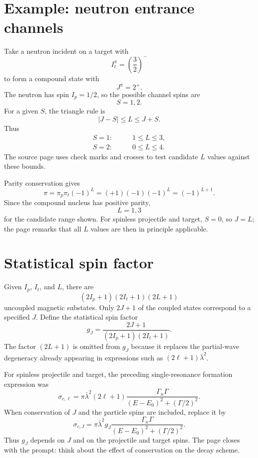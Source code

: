 \section{Example: neutron entrance channels}
Take a neutron incident on a target with
\[
  I_t^\pi=\left(\frac32\right)^-
\]
to form a compound state with
\[
  J^\pi=2^+.
\]
The neutron has spin $I_p=1/2$, so the possible channel spins are
\[
  S=1,2.
\]
For a given $S$, the triangle rule is
\begin{equation}
  |J-S|\le L\le J+S.
  \label{eq:res-L-triangle}
\end{equation}
Thus
\begin{align*}
  S=1:&\qquad 1\le L\le3,\\
  S=2:&\qquad 0\le L\le4.
\end{align*}
The source page uses check marks and crosses to test candidate $L$ values against these bounds.

Parity conservation gives
\[
  \pi=\pi_p\pi_t(-1)^L
  =(+1)(-1)(-1)^L
  =(-1)^{L+1}.
\]
Since the compound nucleus has positive parity,
\begin{equation}
  L=1,3
  \label{eq:res-example-odd-L}
\end{equation}
for the candidate range shown.  For spinless projectile and target, $S=0$, so $J=L$; the page remarks that all $L$ values are then in principle applicable.


\section{Statistical spin factor}
Given $I_p$, $I_t$, and $L$, there are
\[
  (2I_p+1)(2I_t+1)(2L+1)
\]
uncoupled magnetic substates.  Only $2J+1$ of the coupled states correspond to a specified $J$.  Define the statistical spin factor
\begin{equation}
  \boxed{
  g_J=\frac{2J+1}{(2I_p+1)(2I_t+1)}.}
  \label{eq:res-statistical-spin-factor}
\end{equation}
The factor $(2L+1)$ is omitted from $g_J$ because it replaces the partial-wave degeneracy already appearing in expressions such as $(2\ell+1)\bar\lambda^2$.

For spinless projectile and target, the preceding single-resonance formation expression was
\[
  \sigma_{c,\ell}
  =\pi\bar\lambda^2(2\ell+1)
  \frac{\Gamma_n\Gamma}
  {(E-E_0)^2+(\Gamma/2)^2}.
\]
When conservation of $J$ and the particle spins are included, replace it by
\begin{equation}
  \boxed{
  \sigma_{c,J}
  =\pi\bar\lambda^2 g_J
  \frac{\Gamma_n\Gamma}
  {(E-E_0)^2+(\Gamma/2)^2}.}
  \label{eq:res-spin-dependent-formation}
\end{equation}
Thus $g_J$ depends on $J$ and on the projectile and target spins.  The page closes with the prompt: think about the effect of conservation on the decay scheme.

